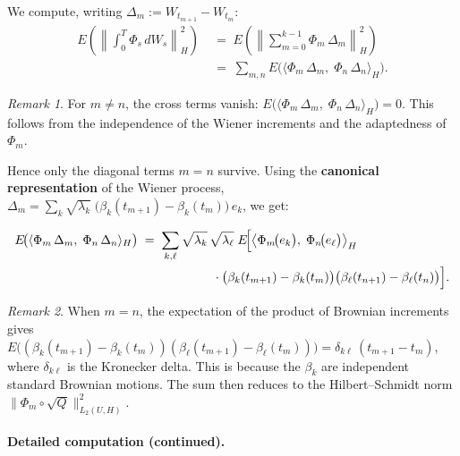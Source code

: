 \documentclass[11pt]{article}
\theoremstyle{definition}
\theoremstyle{remark}
\newtheorem{remark}{Remark}
\begin{document}
We compute, writing $\Delta_m := W_{t_{m+1}} - W_{t_m}$:
\begin{align*}
    E\!\left(
        \left\|\int_0^T \Phi_s\,dW_s\right\|_H^2
    \right)
    &\;=\;
    E\!\left(
        \left\|\sum_{m=0}^{k-1}
        \Phi_m\,\Delta_m\right\|_H^2
    \right) \\[6pt]
    &\;=\;
    \sum_{m,n}
    E\!\bigl(
        \langle \Phi_m\,\Delta_m,\;
                \Phi_n\,\Delta_n \rangle_H
    \bigr).
\end{align*}

\begin{remark}
For $m \neq n$, the cross terms vanish:
$E\!\bigl(\langle \Phi_m\,\Delta_m,\;\Phi_n\,\Delta_n \rangle_H\bigr) = 0$.
This follows from the independence of the Wiener increments and
the adaptedness of $\Phi_m$.
\end{remark}

Hence only the diagonal terms $m = n$ survive.
Using the \textbf{canonical representation} of the Wiener process,
$\Delta_m = \sum_{k} \sqrt{\lambda_k}\;\bigl(\beta_k(t_{m+1}) -
\beta_k(t_m)\bigr)\,e_k$, we get:

\begin{align*}
    E\!\bigl(\langle \Phi_m\,\Delta_m,\;
             \Phi_n\,\Delta_n \rangle_H\bigr)
    &\;=\;
    \sum_{k,\ell}
    \sqrt{\lambda_k}\,\sqrt{\lambda_\ell}\;
    E\!\Bigl[
        \bigl\langle \Phi_m\!\bigl(e_k\bigr),\;
              \Phi_n\!\bigl(e_\ell\bigr)
        \bigr\rangle_H \\
    &\qquad\qquad\qquad \cdot
        \bigl(\beta_k(t_{m+1}) - \beta_k(t_m)\bigr)
        \bigl(\beta_\ell(t_{n+1}) - \beta_\ell(t_n)\bigr)
    \Bigr].
\end{align*}

\begin{remark}
When $m = n$, the expectation of the product of Brownian increments gives
$E\!\bigl((\beta_k(t_{m+1}) - \beta_k(t_m))(\beta_\ell(t_{m+1}) -
\beta_\ell(t_m))\bigr) = \delta_{k\ell}\,(t_{m+1} - t_m)$,
where $\delta_{k\ell}$ is the Kronecker delta. This is because the
$\beta_k$ are independent standard Brownian motions.
The sum then reduces to the Hilbert--Schmidt norm
$\|\Phi_m \circ \sqrt{Q}\|_{L_2(U,H)}^2$.
\end{remark}

\paragraph{Detailed computation (continued).}
\end{document}
